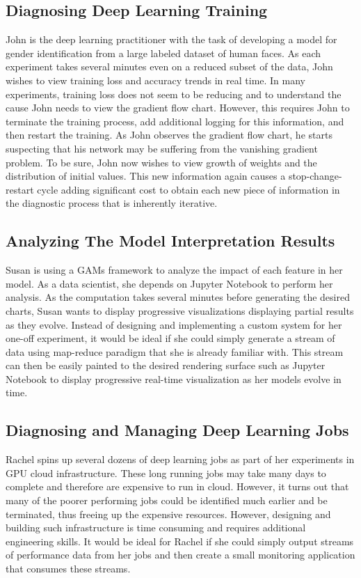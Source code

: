 \documentclass[sigchi]{acmart} %
\begin{document}
\subsection{Diagnosing Deep Learning Training}
John is the deep learning practitioner with the task of developing a model for gender identification from a large labeled dataset of human faces. As each experiment takes several minutes even on a reduced subset of the data, John wishes to view training loss and accuracy trends in real time. In many experiments, training loss does not seem to be reducing and to understand the cause John needs to view the gradient flow chart. However, this requires John to terminate the training process, add additional logging for this information, and then restart the training. As John observes the gradient flow chart, he starts suspecting that his network may be suffering from the vanishing gradient problem. To be sure, John now wishes to view growth of weights and the distribution of initial values. This new information again causes a stop-change-restart cycle adding significant cost to obtain each new piece of information in the diagnostic process that is inherently iterative.

\subsection{Analyzing The Model Interpretation Results}
Susan is using a GAMs framework\cite{Hastie1986} to analyze the impact of each feature in her model. As a data scientist, she depends on Jupyter Notebook to perform her analysis. As the computation takes several minutes before generating the desired charts, Susan wants to display progressive visualizations displaying partial results as they evolve. Instead of designing and implementing a custom system for her one-off experiment, it would be ideal if she could  simply generate a stream of data using map-reduce paradigm that she is already familiar with. This stream can then be easily painted to the desired rendering surface such as Jupyter Notebook to display progressive real-time visualization as her models evolve in time. 

\subsection{Diagnosing and Managing Deep Learning Jobs}
Rachel spins up several dozens of deep learning jobs as part of her experiments in GPU cloud infrastructure. These long running jobs may take many days to complete and therefore are expensive to run in cloud. However, it turns out that many of the poorer performing jobs could be identified much earlier and be terminated, thus freeing up the expensive resources. However, designing and building such infrastructure is time consuming and requires additional engineering skills. It would be ideal for Rachel if she could simply output streams of performance data from her jobs and then create a small monitoring application that consumes these streams.
\end{document}
